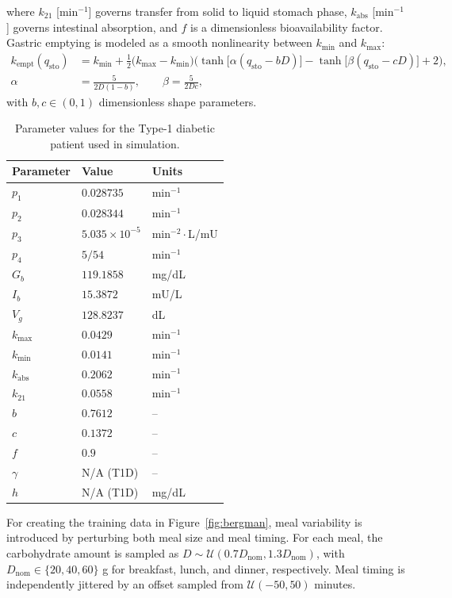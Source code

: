 \documentclass[preprint,12pt]{elsarticle}
\begin{document}
where $k_{21}$ [min$^{-1}$] governs transfer from solid to liquid stomach phase, $k_{\mathrm{abs}}$ [min$^{-1}$] governs intestinal absorption, and $f$ is a dimensionless bioavailability factor. Gastric emptying is modeled as a smooth nonlinearity between $k_{\min}$ and $k_{\max}$:
\begin{align}
k_{\mathrm{empt}}(q_{\mathrm{sto}}) &=
k_{\min} + \tfrac12\big(k_{\max}-k_{\min}\big)\Big(
\tanh\!\big[\alpha(q_{\mathrm{sto}}-bD)\big]
-\tanh\!\big[\beta(q_{\mathrm{sto}}-cD)\big] + 2\Big), \label{eq:kempt}\\
\alpha &= \frac{5}{2D(1-b)}, \qquad
\beta  = \frac{5}{2Dc}, \label{eq:alpha_beta}
\end{align}
with $b,c\in(0,1)$ dimensionless shape parameters. 

\begin{table}[t]
\footnotesize
\centering
\caption{Parameter values for the Type-1 diabetic patient used in simulation.}
\label{tab:t1d_params}
\begin{tabular}{lll}
\hline
\textbf{Parameter} & \textbf{Value} & \textbf{Units} \\
\hline
$p_1$ & $0.028735$ & min$^{-1}$ \\
$p_2$ & $0.028344$ & min$^{-1}$ \\
$p_3$ & $5.035\times 10^{-5}$ & min$^{-2}\cdot$L/mU \\
$p_4$ & $5/54$ & min$^{-1}$ \\
$G_b$ & $119.1858$ & mg/dL \\
$I_b$ & $15.3872$ & mU/L \\
$V_g$ & $128.8237$ & dL \\
$k_{\max}$ & $0.0429$ & min$^{-1}$ \\
$k_{\min}$ & $0.0141$ & min$^{-1}$ \\
$k_{\mathrm{abs}}$ & $0.2062$ & min$^{-1}$ \\
$k_{21}$ & $0.0558$ & min$^{-1}$ \\
$b$ & $0.7612$ & -- \\
$c$ & $0.1372$ & -- \\
$f$ & $0.9$ & -- \\
$\gamma$ & N/A (T1D) & -- \\
$h$ & N/A (T1D) & mg/dL \\
\hline
\end{tabular}
\end{table}

For creating the training data in Figure~\ref{fig:bergman}, 
meal variability is introduced by perturbing both meal size and meal timing. For each meal, the carbohydrate amount is sampled as
\(D \sim \mathcal{U}(0.7D_{\mathrm{nom}},1.3D_{\mathrm{nom}})\),
with \(D_{\mathrm{nom}}\in\{20,40,60\}\) g for breakfast, lunch, and dinner, respectively. Meal timing is independently jittered by an offset sampled from
\(\mathcal{U}(-50,50)\) minutes.
\end{document}
